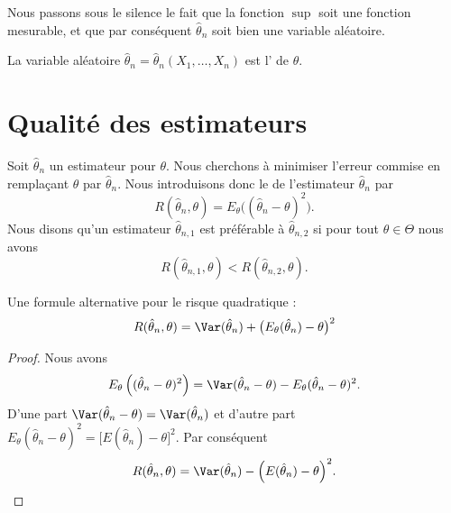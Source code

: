 \begin{remark}
    Nous passons sous le silence le fait que la fonction \( \sup\) soit une fonction mesurable, et que par conséquent \( \hat\theta_n\) soit bien une variable aléatoire.
\end{remark}

La variable aléatoire \( \hat\theta_n=\hat\theta_n(X_1,\ldots,X_n)\) est l' de \( \theta\).



\section{Qualité des estimateurs}

Soit \( \hat\theta_n\) un estimateur pour \( \theta\). Nous cherchons à minimiser l'erreur commise en remplaçant \( \theta\) par \( \hat\theta_n\). Nous introduisons donc le  de l'estimateur \( \hat\theta_n\) par
\begin{equation}
    R(\hat\theta_n,\theta)=E_{\theta}\big( (\hat\theta_n-\theta)^2 \big).
\end{equation}
Nous disons qu'un estimateur \( \hat\theta_{n,1}\) est préférable à \( \hat\theta_{n,2}\) si pour tout \( \theta\in\Theta\) nous avons
\begin{equation}
    R(\hat\theta_{n,1},\theta)<R(\hat\theta_{n,2},\theta).
\end{equation}

\begin{lemma}
    Une formule alternative pour le risque quadratique :
    \begin{equation}
        R(\hat\theta_n,\theta)=\Var(\hat\theta_n)+\big( E_{\theta}(\hat\theta_n)-\theta \big)^2
    \end{equation}
\end{lemma}

\begin{proof}
    Nous avons
    \begin{equation}
        E_{\theta}\left( (\hat\theta_n-\theta)^2 \right)=\Var(\hat\theta_n-\theta)-E_{\theta}(\hat\theta_n-\theta)^2.
    \end{equation}
    D'une part \( \Var(\hat\theta_n-\theta)=\Var(\hat\theta_n)\) et d'autre part \( E_{\theta}(\hat\theta_n-\theta)^2=\big[ E(\hat\theta_n)-\theta \big]^2\). Par conséquent
    \begin{equation}    \label{EqRisqueetbaisiVar}
        R(\hat\theta_n,\theta)=\Var(\hat\theta_n)-\Big( E(\hat\theta_n)-\theta \Big)^2.
    \end{equation}
\end{proof}

